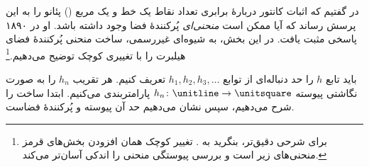 \documentclass[../../../include/open-logic-section]{subfiles}
\begin{document}


در  گفتیم که اثبات کانتور دربارهٔ برابری تعداد نقاط
یک خط و یک مربع () پئانو را
به این پرسش رساند که آیا ممکن است \emph{منحنی‌ای} پُرکنندهٔ فضا وجود داشته
باشد. او در ۱۸۹۰ پاسخی مثبت یافت. در این بخش، به شیوه‌ای غیررسمی، ساخت
منحنی پُرکنندهٔ فضای هیلبرت را با تغییری کوچک توضیح می‌دهیم.\footnote{برای
شرحی دقیق‌تر، بنگرید به \cite{Rose2010}. تغییر کوچک همان افزودن بخش‌های
قرمز منحنی‌های زیر است و بررسی پیوستگی منحنی را اندکی آسان‌تر می‌کند.}

باید تابع $h$ را حد دنباله‌ای از توابع $h_1,h_2,h_3,\dots$ تعریف کنیم.
هر تقریب $h_n$ را به صورت نگاشتی پیوسته
$h_n\colon\unitline\to\unitsquare$ پارامتربندی می‌کنیم. ابتدا ساخت را
شرح می‌دهیم، سپس نشان می‌دهیم حد آن پیوسته و پُرکنندهٔ فضاست.
\end{document}
